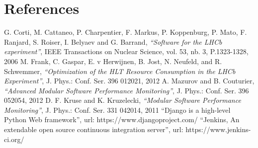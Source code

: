 \documentclass[a4paper]{jpconf}
\begin{document}
\section*{References}

\begin{thebibliography}{3}
 G. Corti, M. Cattaneo, P. Charpentier, F. Markus, P. Koppenburg, P. Mato, F. Ranjard, S. Roiser, I. Belyaev and G. Barrand, {\it ``Software for the LHCb experiment''}, IEEE Transactions on Nuclear Science, vol. 53, nb. 3, P.1323-1328, 2006
M. Frank, C. Gaspar, E. v Herwijnen, B. Jost, N. Neufeld, and R. Schwemmer, {\it ``Optimization of the HLT Resource Consumption in the LHCb Experiment''}, J. Phys.: Conf. Ser. 396 012021, 2012
 A. Mazurov and B. Couturier, {\it ``Advanced Modular Software Performance Monitoring''}, J. Phys.: Conf. Ser. 396 052054, 2012
 D. F. Kruse and K. Kruzelecki, {\it ``Modular Software Performance Monitoring''}, J. Phys.: Conf. Ser. 331 042014, 2011
 ``Django is a high-level Python Web framework'', url: https://www.djangoproject.com/
 ``Jenkins, An extendable open source continuous integration server'', url: https://www.jenkins-ci.org/
\end{thebibliography}
\end{document}
